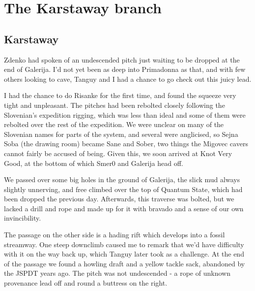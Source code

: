 \section{The Karstaway branch}

 \subsection{Karstaway}

\begin{marginfigure}
\end{marginfigure}
Zdenko had spoken of an undescended pitch just waiting to be dropped at the end of Galerija. I’d not yet been as deep into Primadonna as that, and with few others looking to cave, Tanguy and I had a chance to go check out this juicy lead.
 
I had the chance to do Risanke for the first time, and found the squeeze very tight and unpleasant. The pitches had been rebolted closely following the Slovenian’s expedition rigging, which was less than ideal and some of them were rebolted over the rest of the expedition. We were unclear on many of the Slovenian names for parts of the system, and several were anglicised, so Sejna Soba (the drawing room) became Sane and Sober, two things the Migovec cavers cannot fairly be accused of being. Given this, we soon arrived at Knot Very Good, at the bottom of which Smer0 and Galerija head off.
 
We passed over some big holes in the ground of Galerija, the slick mud always slightly unnerving, and free climbed over the top of Quantum State, which had been dropped the previous day. Afterwards, this traverse was bolted, but we lacked a drill and rope and made up for it with bravado and a sense of our own invincibility.
 
The passage on the other side is a hading rift which develops into a fossil streamway. One steep downclimb caused me to remark that we’d have difficulty with it on the way back up, which Tanguy later took as a challenge. At the end of the passage we found a howling draft and a yellow tackle sack, abandoned by the JSPDT years ago. The pitch was not undescended -  a rope of unknown provenance lead off and round a buttress on the right.
 
